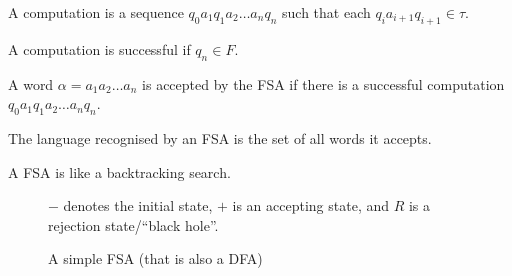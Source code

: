 \documentclass{article}
\begin{document}
\begin{definition}[Computation]
    A computation is a sequence \(q_0 a_1 q_1 a_2 \ldots a_n q_n\)
    such that each \(q_i a_{i+1} q_{i+1} \in \tau\).
\end{definition}
\begin{definition}[Successful]
    A computation is successful if \(q_n \in F\).
\end{definition}
\begin{definition}[Accepted]
    A word \(\alpha = a_1 a_2 \ldots a_n\)
    is accepted by the FSA if there is a
    successful computation \(q_0 a_1 q_1 a_2 \ldots a_n q_n\).
\end{definition}
\begin{definition}[Recognised]
    The language recognised by an FSA is
    the set of all words it accepts. 
\end{definition}
\begin{note}
    A FSA is like a backtracking search.
\end{note}
\begin{figure}[H]
    \centering
    \caption{
        A simple FSA (that is also a DFA)
    }
    \(-\) denotes the initial state, \(+\) is an accepting state,
    and \(R\) is a rejection state/``black hole''.
\end{figure}
\end{document}
